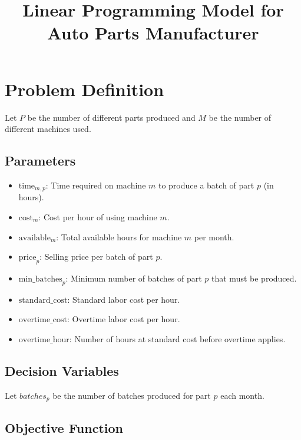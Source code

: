 \documentclass{article}
\begin{document}
\title{Linear Programming Model for Auto Parts Manufacturer}
\author{}
\date{}
\maketitle

\section*{Problem Definition}

Let \( P \) be the number of different parts produced and \( M \) be the number of different machines used. 

\subsection*{Parameters}

\begin{itemize}
    \item \( \text{time}_{m,p} \): Time required on machine \( m \) to produce a batch of part \( p \) (in hours).
    \item \( \text{cost}_{m} \): Cost per hour of using machine \( m \).
    \item \( \text{available}_{m} \): Total available hours for machine \( m \) per month.
    \item \( \text{price}_{p} \): Selling price per batch of part \( p \).
    \item \( \text{min\_batches}_{p} \): Minimum number of batches of part \( p \) that must be produced.
    \item \( \text{standard\_cost} \): Standard labor cost per hour.
    \item \( \text{overtime\_cost} \): Overtime labor cost per hour.
    \item \( \text{overtime\_hour} \): Number of hours at standard cost before overtime applies.
\end{itemize}

\subsection*{Decision Variables}

Let \( batches_{p} \) be the number of batches produced for part \( p \) each month.

\subsection*{Objective Function}
\end{document}
